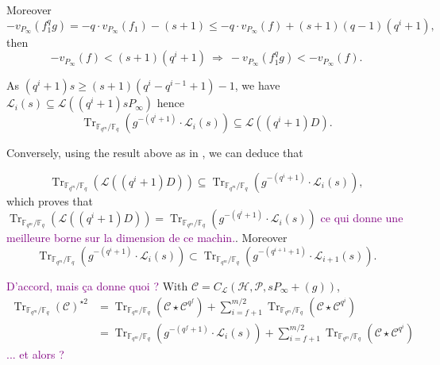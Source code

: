 \documentclass[a4paper]{article}
\newcommand{\calP}{\mathcal{P}}
\newcommand{\calH}{\mathcal{H}}
\newcommand{\calL}{\mathcal{L}}
\newcommand{\calC}{\mathcal{C}}
\newcommand{\fq}{\mathbb{F}_{q}}
\newcommand{\Tr}[1]{\operatorname{Tr}_{\mathbb{F}_{q^m}/\fq}\left(#1\right)}
\newcommand\jade[1]{\textcolor{purple}{#1}}
\begin{document}
Moreover
\[-v_{P_\infty}(f_1^qg) = -q\cdot v_{P_\infty}(f_1) - (s+1) \leq -q\cdot v_{P_\infty}(f) + (s+1)(q-1)(q^i+1) ,\]
then 
\[-v_{P_\infty}(f) < (s+1)(q^i+1) \: \Rightarrow \: -v_{P_\infty}(f_1^qg) < -v_{P_\infty}(f).\]


As $(q^i+1)s \geq (s+1)(q^i-q^{i-1}+1)-1$, we have $\calL_i(s) \subseteq \calL((q^i+1)sP_\infty)$ hence
\[ 
\Tr{g^{-(q^i+1)}\cdot \calL_i(s)} \subseteq \calL((q^i+1)D). 
\]

Conversely, using the result above as in \cite{rocco}, we can deduce that 

\[
\Tr{\calL((q^i+1)D)} \subseteq \Tr{g^{-(q^i+1)}\cdot \calL_i(s)},
\]
which proves that $\Tr{\calL((q^i+1)D)} = \Tr{g^{-(q^i+1)}\cdot \calL_i(s)}$ \jade{ce qui donne une meilleure borne sur la dimension de ce machin.}.
Moreover
\[
\Tr{g^{-(q^i+1)}\cdot \calL_i(s)} \subset \Tr{g^{-(q^{i+1}+1)}\cdot \calL_{i+1}(s)}.
\]

\jade{D'accord, mais ça donne quoi ?}
With $\calC=C_{\calL}(\calH,\calP,sP_\infty+(g))$,
\begin{align*}
	\Tr{\calC}^{\star 2}&= \Tr{\calC \star \calC^{q^f}} + \sum\limits_{i=f+1}^{m/2} \Tr{\calC \star \calC^{q^i}} \\
						&=	\Tr{g^{-(q^f+1)}\cdot \calL_i(s)} + \sum\limits_{i=f+1}^{m/2} \Tr{\calC \star \calC^{q^i}} 
\end{align*}
\jade{... et alors ? }






\clearpage


\end{document}
